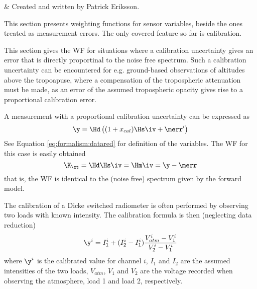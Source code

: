 %
%
 \label{sec:wfuns_sens}


%
%
 & Created and written by Patrick Eriksson.\\
\stophistory


%
%
%



%
%
This section presents weighting functions for sensor variables, beside the
ones treated as measurement errors. The only covered feature so far is calibration.




 \label{sec:wfuns_sens:cal}
 
 This section gives the WF for situations where a calibration
 uncertainty gives an error that is directly proportinal to the noise
 free spectrum.  Such a calibration uncertainty can be encountered for
 e.g. ground-based observations of altitudes above the tropoapuse,
 where a compensation of the tropospheric attenuation must be made, as an
 error of the assumed tropospheric opacity gives rise to a proportional 
 calibration error.

 A measurement with a proportional calibration uncertainty
 can be expressed as
 \begin{equation}
   \y = \Hd\left( (1+x_{cal})\Hs\iv+\merr' \right)
 \end{equation}
 See Equation \ref{eq:formalism:datared} for definition of the variables.
 The WF for this case is easily obtained
 \begin{equation}
   \K_{\xt} = \Hd\Hs\iv = \Hm\iv = \y - \merr
 \end{equation}
 that is, the WF is identical to the (noise free) spectrum given by the forward
 model. 

 
 The calibration of a Dicke switched radiometer is often performed by
 observing two loads with known intensity. The calibration formula is
 then (neglecting data reduction)
 \begin{equation}
   \y^i =  I_1^i + (I_2^i-I_1^i)\frac{V_{atm}^i-V_1^i}{V_2^i-V_1^i} 
  \label{sec:wfuns_sens:loadcal}
 \end{equation}
 where $\y^i$ is the calibrated value for channel $i$, $I_1$ and $I_2$
 are the assumed intensities of the two loads, $V_{atm}$, $V_1$ and
 $V_2$ are the voltage recorded when observing the atmosphere, load 1
 and load 2, respectively.
 
